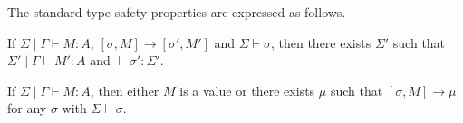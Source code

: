 The standard type safety properties are expressed as follows.
\begin{thm}
  If $\Sigma\mid\Gamma \vdash M : A$, $[\sigma,M] \to [\sigma',M']$ and $\Sigma \vdash \sigma$,
  then there exists $\Sigma'$ such that $\Sigma' \mid \Gamma \vdash M' : A$ and $\vdash \sigma' : \Sigma'$.
\end{thm}

\begin{thm}[Progress]
  If $\Sigma \mid \Gamma \vdash M : A$,
  then either $M$ is a value or there exists $\mu$ such that $[\sigma,M] \to \mu$ for any $\sigma$ with $\Sigma \vdash \sigma$.
\end{thm}
